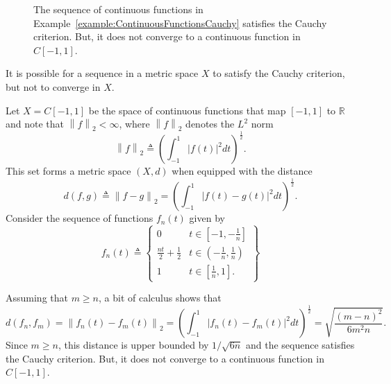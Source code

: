 \begin{figure}[ht]
\begin{center}
\vspace{-8mm}
\end{center}
\caption{The sequence of continuous functions in Example~\ref{example:ContinuousFunctionsCauchy} satisfies the Cauchy criterion.
But, it does not converge to a continuous function in $C[-1,1]$.}
\end{figure}

It is possible for a sequence in a metric space $X$ to satisfy the Cauchy criterion, but not to converge in $X$.

\begin{example}
\label{example:ContinuousFunctionsCauchy}
Let $X=C[-1,1]$ be the space of continuous functions that map $[-1,1]$ to $\mathbb{R}$ and note that $\left\| f \right\|_2 < \infty$, where $\left\| f \right\|_2$ denotes the $L^2$ norm
\begin{equation*}
\left\| f \right\|_2 \triangleq \left( \int_{-1}^1 |f(t)|^2 dt \right)^{\frac{1}{2}}.
\end{equation*}
This set forms a metric space $(X,d)$ when equipped with the distance
\[ d(f, g) \triangleq \left\| f - g \right\|_2
= \left( \int_{-1}^1 |f(t) - g(t)|^2 dt \right)^{\frac{1}{2}}. \]
Consider the sequence of functions $f_n(t)$ given by
\begin{equation*}
f_n(t) \triangleq \left\{ \begin{array}{ll}
0 & t \in \left[ -1, -\frac{1}{n} \right] \\
\frac{nt}{2} + \frac{1}{2} & t \in \left( -\frac{1}{n}, \frac{1}{n} \right) \\
1 & t \in \left[ \frac{1}{n}, 1 \right].
\end{array} \right\}
\end{equation*}

Assuming that $m \geq n$, a bit of calculus shows that
\begin{equation*}
d(f_n, f_m) = \left\| f_n(t) - f_m(t) \right\|_2
= \left( \int_{-1}^1 |f_n(t) - f_m(t)|^2 dt \right)^{\frac{1}{2}}
= \sqrt{\frac{(m-n)^2}{6m^2n}}.
\end{equation*}
Since $m\geq n$, this distance is upper bounded by $1/\sqrt{6n}$ and the sequence satisfies the Cauchy criterion.
But, it does not converge to a continuous function in $C[-1,1]$.
\end{example}

